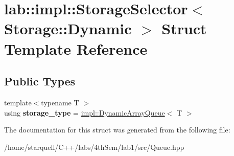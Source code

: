 \hypertarget{structlab_1_1impl_1_1StorageSelector_3_01Storage_1_1Dynamic_01_4}{}\section{lab\+:\+:impl\+:\+:Storage\+Selector$<$ Storage\+:\+:Dynamic $>$ Struct Template Reference}
\label{structlab_1_1impl_1_1StorageSelector_3_01Storage_1_1Dynamic_01_4}
\subsection*{Public Types}
\begin{DoxyCompactItemize}
\item 
\mbox{\label{structlab_1_1impl_1_1StorageSelector_3_01Storage_1_1Dynamic_01_4_ace5d3014667be4ed39cfafcaf4882a5d}} 
{\footnotesize template$<$typename T $>$ }\\using {\bfseries storage\+\_\+type} = \hyperlink{classlab_1_1impl_1_1DynamicArrayQueue}{impl\+::\+Dynamic\+Array\+Queue}$<$ T $>$
\end{DoxyCompactItemize}


The documentation for this struct was generated from the following file\+:\begin{DoxyCompactItemize}
\item 
/home/starquell/\+C++/labs/4th\+Sem/lab1/src/Queue.\+hpp\end{DoxyCompactItemize}

